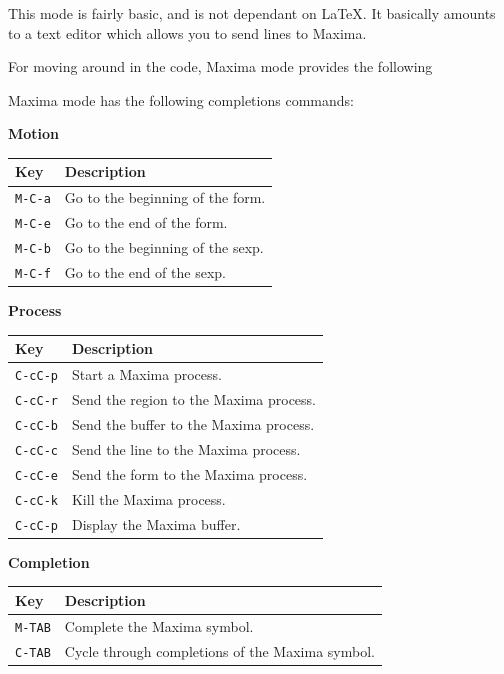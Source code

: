 This mode is fairly basic, and is not dependant on LaTeX.  It basically amounts
to a text editor which allows you to send lines to Maxima.  

For moving around in the code, Maxima mode provides the following

\noindent
Maxima mode has the following completions commands:

\textbf{Motion}

\smallskip

\noindent
\begin{tabular}{p{\firstcol}p{\secondcol}}
\hline
\textbf{Key} & \textbf{Description}\\
\hline
\texttt{M-C-a} & Go to the beginning of the form.\\
\texttt{M-C-e} & Go to the end of the form.\\
\texttt{M-C-b} & Go to the beginning of the sexp.\\
\texttt{M-C-f} & Go to the end of the sexp.
\end{tabular}

\smallskip

\noindent
\textbf{Process}

\smallskip

\noindent
\begin{tabular}{p{\firstcol}p{\secondcol}}
\hline
\textbf{Key} & \textbf{Description}\\
\hline
\texttt{C-cC-p} & Start a Maxima process.\\
\texttt{C-cC-r} & Send the region to the Maxima process.\\
\texttt{C-cC-b} & Send the buffer to the Maxima process.\\
\texttt{C-cC-c} & Send the line to the Maxima process.\\
\texttt{C-cC-e} & Send the form to the Maxima process.\\
\texttt{C-cC-k} & Kill the Maxima process.\\
\texttt{C-cC-p} & Display the Maxima buffer.
\end{tabular}

\smallskip

\noindent
\textbf{Completion}

\smallskip

\noindent
\begin{tabular}{p{\firstcol}p{\secondcol}}
\hline
\textbf{Key} & \textbf{Description}\\
\hline
\texttt{M-TAB} & Complete the Maxima symbol.\\
\texttt{C-TAB} & Cycle through completions of the Maxima symbol.\\
\end{tabular}

